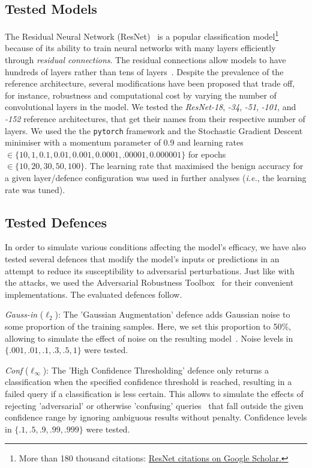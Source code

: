 \subsection{Tested Models}
\label{models}

The Residual Neural Network (ResNet)~\cite{resnet} is a popular classification model\footnote{More than 180 thousand citations: \href{https://scholar.google.com/scholar?cites=9281510746729853742}{ResNet citations on Google Scholar.}} because of its ability to train neural networks with many layers efficiently through \textit{residual connections}.
The residual connections allow models to have hundreds of layers rather than tens of layers~\cite{resnet,vgg}. Despite the prevalence of the reference architecture, several modifications have been proposed that trade off, for instance, robustness and computational cost by varying the number of convolutional layers in the model. We tested the \textit{ResNet-18}, \textit{-34}, \textit{-51}, \textit{-101}, and \textit{-152} reference architectures, that get their names from their respective number of layers. We used the the \texttt{pytorch} framework and the Stochastic Gradient Descent minimiser with a momentum parameter of 0.9 and learning rates $\in \{10, 1, 0.1, 0.01, 0.001, 0.0001, .00001, 0.000001\}$ for epochs $\in \{ 10, 20, 30, 50, 100\}$. The learning rate that maximised the benign accuracy for a given layer/defence configuration was used in further analyses (\textit{i.e.}, the learning rate was tuned).

\subsection{Tested Defences}
\label{defences}

In order to simulate various conditions affecting the model's efficacy, we have also tested several defences that modify the model's inputs or predictions in an attempt to reduce its susceptibility to adversarial perturbations. Just like with the attacks, we used the Adversarial Robustness Toolbox~\cite{art2018} for their convenient implementations. The evaluated defences follow.


\textit{Gauss-in} ($\ell_2$): The 'Gaussian Augmentation' defence adds Gaussian noise to some proportion of the training samples. Here, we set this proportion to 50\%, allowing to simulate the effect of noise on the resulting model~\cite{gauss_aug}. Noise levels in $\{.001, .01, .1, .3, .5, 1\}$ were tested.


\textit{Conf} ($\ell_{\infty}$): The 'High Confidence Thresholding' defence only returns a classification when the specified confidence threshold is reached, resulting in a failed query if a classification is less certain. This allows to simulate the effects of rejecting 'adversarial' or otherwise 'confusing' queries~\cite{high_conf} that fall outside the given confidence range by ignoring ambiguous results without penalty. Confidence levels in $\{.1, .5, .9, .99, .999\}$ were tested.


